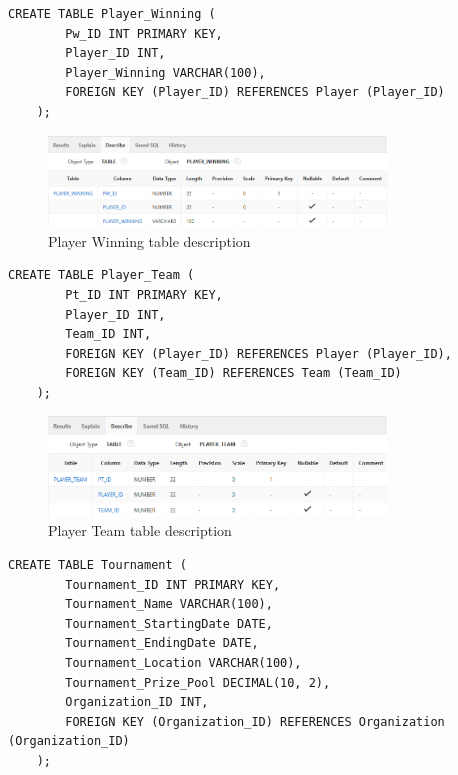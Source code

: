 \begin{lstlisting}[caption={Create Player Winning table}, label={lst:create_player_winning}]
    CREATE TABLE Player_Winning (
        Pw_ID INT PRIMARY KEY,
        Player_ID INT,
        Player_Winning VARCHAR(100),
        FOREIGN KEY (Player_ID) REFERENCES Player (Player_ID)
    );
    \end{lstlisting}
\begin{figure}[H]
    \centering
    \includegraphics[width=0.8\textwidth]{images/TableDesc/PLAYER_WINNING.png}
    \caption{Player Winning table description}
    \label{fig:player_winning_table}
\end{figure}
\begin{lstlisting}[caption={Create Player Team table}, label={lst:create_player_team}]
    CREATE TABLE Player_Team (
        Pt_ID INT PRIMARY KEY,
        Player_ID INT,
        Team_ID INT,
        FOREIGN KEY (Player_ID) REFERENCES Player (Player_ID),
        FOREIGN KEY (Team_ID) REFERENCES Team (Team_ID)
    );
    \end{lstlisting}
\begin{figure}[H]
    \centering
    \includegraphics[width=0.8\textwidth]{images/TableDesc/PLAYER_TEAM.png}
    \caption{Player Team table description}
    \label{fig:player_team_table}
\end{figure}
\begin{lstlisting}[caption={Create Tournament table}, label={lst:create_tournament}]
    CREATE TABLE Tournament (
        Tournament_ID INT PRIMARY KEY,
        Tournament_Name VARCHAR(100),
        Tournament_StartingDate DATE,
        Tournament_EndingDate DATE,
        Tournament_Location VARCHAR(100),
        Tournament_Prize_Pool DECIMAL(10, 2),
        Organization_ID INT,
        FOREIGN KEY (Organization_ID) REFERENCES Organization (Organization_ID)
    );
    \end{lstlisting}
